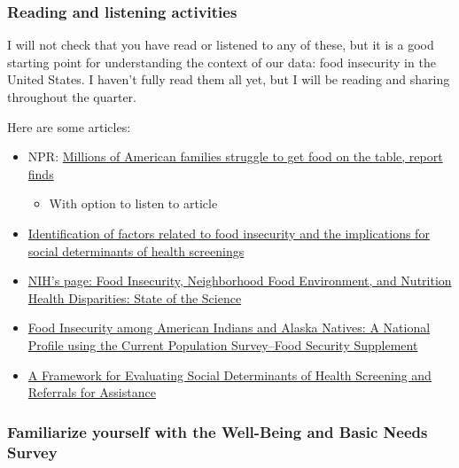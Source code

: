 \documentclass[
  letterpaper,
  DIV=11,
  numbers=noendperiod]{scrartcl}
\providecommand{\tightlist}{%
  \setlength{\itemsep}{0pt}\setlength{\parskip}{0pt}}
\begin{document}
\subsubsection{Reading and listening
activities}\label{reading-and-listening-activities}

I will not check that you have read or listened to any of these, but it
is a good starting point for understanding the context of our data: food
insecurity in the United States. I haven't fully read them all yet, but
I will be reading and sharing throughout the quarter.

Here are some articles:

\begin{itemize}
\item
  NPR:
  \href{https://www.npr.org/sections/health-shots/2023/10/26/1208760054/food-insecurity-families-struggle-hunger-poverty}{Millions
  of American families struggle to get food on the table, report finds}

  \begin{itemize}
  \tightlist
  \item
    With option to listen to article
  \end{itemize}
\item
  \href{https://bmcpublichealth.biomedcentral.com/articles/10.1186/s12889-021-11465-6\#Tab2}{Identification
  of factors related to food insecurity and the implications for social
  determinants of health screenings}
\item
  \href{https://www.nhlbi.nih.gov/events/2021/food-insecurity-neighborhood-food-environment-and-nutrition-health-disparities}{NIH's
  page: Food Insecurity, Neighborhood Food Environment, and Nutrition
  Health Disparities: State of the Science}
\item
  \href{https://www.ncbi.nlm.nih.gov/pmc/articles/PMC5422031/}{Food
  Insecurity among American Indians and Alaska Natives: A National
  Profile using the Current Population Survey--Food Security Supplement}
\item
  \href{https://journals.sagepub.com/doi/10.1177/21501327211052204}{A
  Framework for Evaluating Social Determinants of Health Screening and
  Referrals for Assistance}
\end{itemize}

\subsubsection{Familiarize yourself with the Well-Being and Basic Needs
Survey}\label{familiarize-yourself-with-the-well-being-and-basic-needs-survey}
\end{document}
